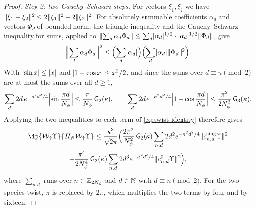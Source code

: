 \begin{proof}
\emph{Step 2: two Cauchy--Schwarz steps.} For vectors $\xi_1,\xi_2$ we have
$\lVert\xi_1+\xi_2\rVert^2\le2\lVert\xi_1\rVert^2+2\lVert\xi_2\rVert^2$. For absolutely summable coefficients $\alpha_d$ and vectors $\Phi_d$ of
bounded norm, the triangle inequality and the Cauchy--Schwarz inequality for sums, applied to
$\lVert\sum_d\alpha_d\Phi_d\rVert\le\sum_d\lvert\alpha_d\rvert^{1/2}\cdot\lvert\alpha_d\rvert^{1/2}\lVert\Phi_d\rVert$, give
\[
\Bigl\lVert\sum_d\alpha_d\Phi_d\Bigr\rVert^2\le\Bigl(\sum_d\lvert\alpha_d\rvert\Bigr)\Bigl(\sum_d\lvert\alpha_d\rvert\lVert\Phi_d\rVert^2\Bigr).
\]
With $\lvert\sin x\rvert\le\lvert x\rvert$ and $\lvert1-\cos x\rvert\le x^2/2$, and since the sums over $d\equiv n\pmod2$ are at most the sums
over all $d\ge1$,
\[
\sum_d2d\,e^{-\kappa^2d^2/4}\Bigl\lvert\sin\frac{\pi d}{N_{\phi}}\Bigr\rvert\le\frac\pi{N_{\phi}}\,\mathsf G_2(\kappa),\qquad
\sum_d2d\,e^{-\kappa^2d^2/4}\Bigl\lvert1-\cos\frac{\pi d}{N_{\phi}}\Bigr\rvert\le\frac{\pi^2}{2N_{\phi}^2}\,\mathsf G_3(\kappa).
\]
Applying the two inequalities to each term of \eqref{eq:twist-identity} therefore gives
\begin{multline}\label{eq:twist-cs}
\ip{\mathcal W_\up\Upsilon}{H_N\mathcal W_\up\Upsilon}\le\frac{\kappa^3}{\sqrt{2\pi}}\Bigl(\frac{2\pi^2}{\Nphi^2}\,\mathsf G_2(\kappa)
\sum_{n,d}2d^2e^{-\kappa^2d^2/4}\norm{c^{\rm sing}_{n,d}\Upsilon}^2\\
+\frac{\pi^4}{2\Nphi^4}\,\mathsf G_3(\kappa)\sum_{n,d}2d^3e^{-\kappa^2d^2/4}\norm{c^0_{n,d}\Upsilon}^2\Bigr),
\end{multline}
where $\sum_{n,d}$ runs over $n\in\mathbb{Z}_{2N_{\phi}}$ and $d\in\mathbb{N}$ with $d\equiv n\pmod2$. For the two-species twist, $\pi$ is
replaced by $2\pi$, which multiplies the two terms by four and by sixteen.


\end{proof}
